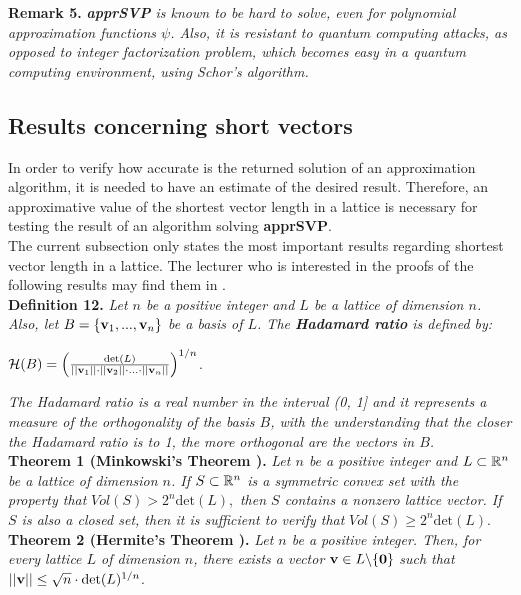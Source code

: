 \textbf{Remark 5. } \textit{\textbf{apprSVP} is known to be hard to solve, even for polynomial approximation functions $\psi$. Also, it is resistant to quantum computing attacks, as opposed to integer factorization problem, which becomes easy in a quantum computing environment, using Schor's algorithm.}

\subsection{Results concerning short vectors}

In order to verify how accurate is the returned solution of an approximation algorithm, it is needed to have an estimate of the desired result. Therefore, an approximative value of the shortest vector length in a lattice is necessary for testing the result of an algorithm solving \textbf{apprSVP}. \\

The current subsection only states the most important results regarding shortest vector length in a lattice. The lecturer who is interested in the proofs of the following results may find them in \cite{HPS08}.\\

\textbf{Definition 12.} \textit{Let $n$ be a positive integer and $L$ be a lattice of dimension $n$. Also, let} $B = \{\textbf{v}_1,...,\textbf{v}_n\}$ \textit{be a basis of $L$. The \textbf{Hadamard ratio} is defined by:}
\begin{center}
	$\mathcal{H}(B) = \Big(\frac{\text{det}(L)}{||\textbf{v}_1|| \cdot ||\textbf{v}_2|| \cdot ... \cdot ||\textbf{v}_n||} \Big)^{1/n}$.
\end{center}
\textit{The Hadamard ratio is a real number in the interval (0, 1] and it represents a measure of the orthogonality of the basis $B$, with the understanding that the closer the Hadamard ratio is to 1, the more orthogonal are the vectors in $B$.}\\

\textbf{Theorem 1 (Minkowski's Theorem \cite{HPS08}).} \textit{Let $n$ be a positive integer and $L\subset \mathbb{R}^n$ be a lattice of dimension $n$. If $S \subset \mathbb{R}^n$ is a symmetric convex set with the property that} $Vol(S) > 2^n \text{det}(L),$ \textit{then $S$ contains a nonzero lattice vector. If $S$ is also a closed set, then it is sufficient to verify that }$Vol(S) \geq 2^n \text{det}(L)$. \\

\textbf{Theorem 2 (Hermite's Theorem \cite{HPS08}).} \textit{Let $n$ be a positive integer. Then, for every lattice $L$ of dimension $n$, there exists a vector} $\textbf{v} \in L \backslash\{\textbf{0}\}$ \textit{such that}  $||\textbf{v}|| \leq \sqrt{n} \cdot \text{det} (L) ^{1/n}$.\\

